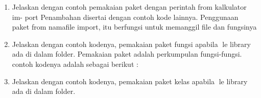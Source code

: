 \begin{enumerate}
\begin{itemize}
    \end{itemize}
    

    \item Jelaskan dengan contoh pemakaian paket dengan perintah from kalkulator im-
    port Penambahan disertai dengan contoh kode lainnya.
    Penggunaan paket from namafile import, itu berfungsi untuk memanggil file dan fungsinya
    

    \item Jelaskan dengan contoh kodenya, pemakaian paket fungsi apabila le library
    ada di dalam folder.
    Pemakaian paket adalah perkumpulan fungsi-fungsi. contoh kodenya adalah sebagai berikut :

    \item Jelaskan dengan contoh kodenya, pemakaian paket kelas apabila le library ada
    di dalam folder.
    

\end{enumerate}
